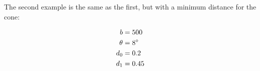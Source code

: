 \documentclass[12pt]{article}
\begin{document}
\resizebox{\textwidth}{!}{}

The second example is the same as the first, but with a minimum
distance for the cone:

\begin{equation}
\begin{split}
b &= 500 \\
\theta &= 8\degree \\
d_0 &= 0.2 \\
d_1 &= 0.45
\end{split}
\end{equation}

\resizebox{\textwidth}{!}{}
\end{document}

